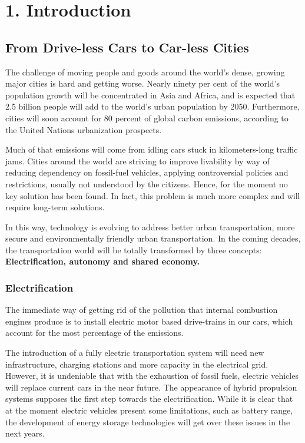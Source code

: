 \chapter{1. Introduction}

\section{From Drive-less Cars to Car-less Cities}
\setcounter{page}{1}
The challenge of moving people and goods around the world's dense, growing major cities is hard and getting worse. Nearly ninety per cent of the world's population growth will be concentrated in Asia and Africa, and is expected that 2.5 billion people will add to the world's urban population by 2050. Furthermore, cities will soon account for 80 percent of global carbon emissions, according to the United Nations urbanization prospects.\cite{UnitedNations2014}  

Much of that emissions will come from idling cars stuck in kilometers-long traffic jams. Cities around the world are striving to improve livability by way of reducing dependency on fossil-fuel vehicles, applying controversial policies and restrictions, usually not understood by the citizens. Hence, for the moment no key solution has been found. In fact, this problem is much more complex and will require long-term solutions. 

In this way, technology is evolving to address better urban transportation, more secure and environmentally friendly urban transportation. In the coming decades, the transportation world will be totally transformed by three concepts: \textbf{Electrification, autonomy and shared economy.}

\newpage
\subsection{Electrification}

The immediate way of getting rid of the pollution that internal combustion engines produce is to install electric motor based drive-trains in our cars, which account for the most percentage of the emissions. 

The introduction of a fully electric transportation system will need new infrastructure, charging stations and more capacity in the electrical grid.
However, it is undeniable that with the exhaustion of fossil fuels, electric vehicles will replace current cars in the near future. The appearance of hybrid propulsion systems supposes the first step towards the electrification.
While it is clear that at the moment electric vehicles present some limitations, such as battery range, the development of energy storage technologies will get over these issues in the next years.


